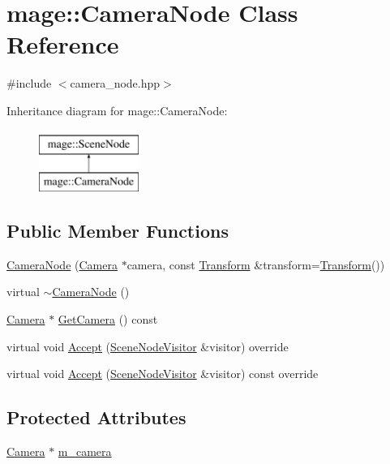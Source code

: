 \hypertarget{classmage_1_1_camera_node}{}\section{mage\+:\+:Camera\+Node Class Reference}
\label{classmage_1_1_camera_node}


{\ttfamily \#include $<$camera\+\_\+node.\+hpp$>$}

Inheritance diagram for mage\+:\+:Camera\+Node\+:\begin{figure}[H]
\begin{center}
\leavevmode
\includegraphics[height=2.000000cm]{classmage_1_1_camera_node}
\end{center}
\end{figure}
\subsection*{Public Member Functions}
\begin{DoxyCompactItemize}
\item 
\hyperlink{classmage_1_1_camera_node_aa6b469b939b268275665f5b962b82d4a}{Camera\+Node} (\hyperlink{classmage_1_1_camera}{Camera} $\ast$camera, const \hyperlink{structmage_1_1_transform}{Transform} \&transform=\hyperlink{structmage_1_1_transform}{Transform}())
\item 
virtual \hyperlink{classmage_1_1_camera_node_a2b66360b99bf03ee2f66a3a74be31792}{$\sim$\+Camera\+Node} ()
\item 
\hyperlink{classmage_1_1_camera}{Camera} $\ast$ \hyperlink{classmage_1_1_camera_node_a7cd05fd41271259870483de5b3ed6ebe}{Get\+Camera} () const
\item 
virtual void \hyperlink{classmage_1_1_camera_node_aed9c3c12cc4163fed880c49e43380efe}{Accept} (\hyperlink{classmage_1_1_scene_node_visitor}{Scene\+Node\+Visitor} \&visitor) override
\item 
virtual void \hyperlink{classmage_1_1_camera_node_a8b94f57b3a04f70b2c04a3d7c1ba3082}{Accept} (\hyperlink{classmage_1_1_scene_node_visitor}{Scene\+Node\+Visitor} \&visitor) const override
\end{DoxyCompactItemize}
\subsection*{Protected Attributes}
\begin{DoxyCompactItemize}
\item 
\hyperlink{classmage_1_1_camera}{Camera} $\ast$ \hyperlink{classmage_1_1_camera_node_aee902112c2e70e8de69b69aed303ca1f}{m\+\_\+camera}
\end{DoxyCompactItemize}
